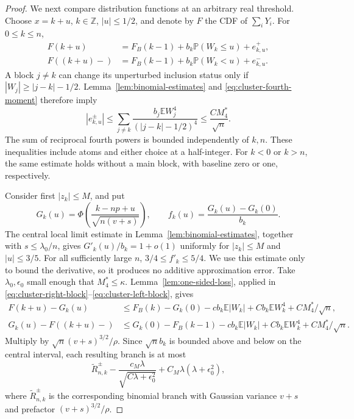 \documentclass[aop]{imsart}
\theoremstyle{plain}
\theoremstyle{definition}
\theoremstyle{definition}
\newcommand{\PP}{\mathbb P}
\newcommand{\EE}{\mathbb E}
\begin{document}
\begin{proof}
We next compare distribution functions at an arbitrary real threshold.
Choose $x=k+u$, $k\in\mathbb Z$, $|u|\le1/2$, and denote by $F$ the
CDF of $\sum_iY_i$. For $0\le k\le n$,
\begin{align}
 F(k+u)&=F_B(k-1)+b_k\PP(W_k\le u)+e^+_{k,u},
 \label{eq:cluster-right-block}\\
 F((k+u)-)&=F_B(k-1)+b_k\PP(W_k<u)+e^-_{k,u}.
 \label{eq:cluster-left-block}
\end{align}
A block $j\ne k$ can change its unperturbed inclusion status only if
$|W_j|\ge|j-k|-1/2$. Lemma~\ref{lem:binomial-estimates} and
\eqref{eq:cluster-fourth-moment} therefore imply
\begin{equation}\label{eq:cluster-leakage}
 |e^\pm_{k,u}|\le
 \sum_{j\ne k}\frac{b_j\EE W_j^4}{(|j-k|-1/2)^4}
 \le\frac{CM_4^*}{\sqrt n}.
\end{equation}
The sum of reciprocal fourth powers is bounded independently of $k,n$.
These inequalities include atoms and either choice at a half-integer.
For $k<0$ or $k>n$, the same estimate holds without a main block, with
baseline zero or one, respectively.

Consider first $|z_k|\le M$, and put
\[
 G_k(u)=\Phi\left(\frac{k-np+u}{\sqrt{n(v+s)}}\right),\qquad
 f_k(u)=\frac{G_k(u)-G_k(0)}{b_k}.
\]
The central local limit estimate in Lemma~\ref{lem:binomial-estimates},
together with $s\le\lambda_0/n$, gives $G'_k(u)/b_k=1+o(1)$ uniformly
for $|z_k|\le M$ and $|u|\le3/5$. For all sufficiently large $n$,
$3/4\le f'_k\le5/4$. We use this estimate only to bound the derivative,
so it produces no additive approximation error. Take
$\lambda_0,\epsilon_0$ small enough that $M_4^*\le\kappa$.
Lemma~\ref{lem:one-sided-loss}, applied in
\eqref{eq:cluster-right-block}--\eqref{eq:cluster-left-block}, gives
\begin{align*}
 F(k+u)-G_k(u)
 &\le F_B(k)-G_k(0)-cb_k\EE|W_k|
       +Cb_k\EE W_k^4+CM_4^*/\sqrt n,\\
 G_k(u)-F((k+u)-)
 &\le G_k(0)-F_B(k-1)-cb_k\EE|W_k|
       +Cb_k\EE W_k^4+CM_4^*/\sqrt n.
\end{align*}
Multiply by $\sqrt n(v+s)^{3/2}/\rho$. Since $\sqrt n b_k$ is bounded
above and below on the central interval, each resulting branch is at
most
\begin{equation}\label{eq:cluster-central-comparison}
 \widetilde R^\pm_{n,k}
 -\frac{c_M\lambda}{\sqrt{C\lambda+\epsilon_0^2}}
 +C_M\lambda(\lambda+\epsilon_0^2),
\end{equation}
where $\widetilde R^\pm_{n,k}$ is the corresponding binomial branch
with Gaussian variance $v+s$ and prefactor $(v+s)^{3/2}/\rho$.


\end{proof}
\end{document}

